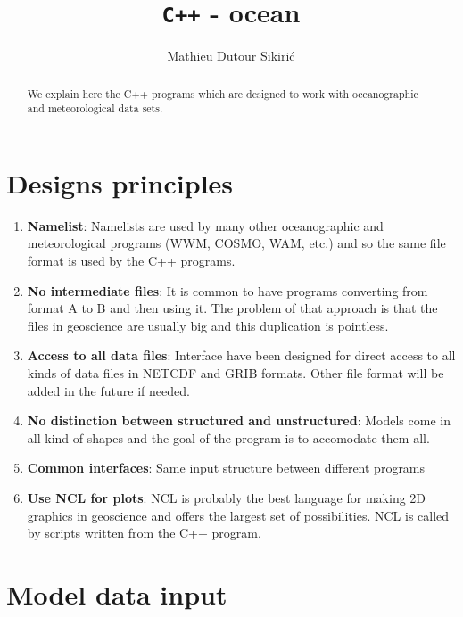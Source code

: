 \documentclass[12pt]{amsart}
\begin{document}
\author{Mathieu Dutour Sikiri\'c}
\address{Mathieu Dutour Sikiri\'c, Rudjer Boskovi\'c Institute, Bijenicka 54, 10000 Zagreb, Croatia, Fax: +385-1-468-0245}



\title{{\tt C++} - ocean}


\maketitle

\begin{abstract}
We explain here the C++ programs which are designed to work with oceanographic and meteorological data sets.
\end{abstract}

\section{Designs principles}

\begin{enumerate}
\item {\bf Namelist}: Namelists are used by many other oceanographic and meteorological programs (WWM, COSMO, WAM, etc.) and so the same file format is used by the C++ programs.
\item {\bf No intermediate files}: It is common to have programs converting from format A to B and then using it. The problem of that approach is that the files in geoscience are usually big and this duplication is pointless.
\item {\bf Access to all data files}: Interface have been designed for direct access to all kinds of data files in NETCDF and GRIB formats. Other file format will be added in the future if needed.
\item {\bf No distinction between structured and unstructured}: Models come in all kind of shapes and the goal of the program is to accomodate them all.
\item {\bf Common interfaces}: Same input structure between different programs
\item {\bf Use NCL for plots}: NCL is probably the best language for making 2D graphics in geoscience and offers the largest set of possibilities. NCL is called by scripts written from the C++ program.
\end{enumerate}






\section{Model data input}
\end{document}
